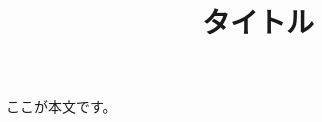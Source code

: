 \documentclass[dvipdfmx]{jlreq}
\title{タイトル}
\author{}
\date{}
\begin{document}
\maketitle

ここが本文です。
\end{document}
